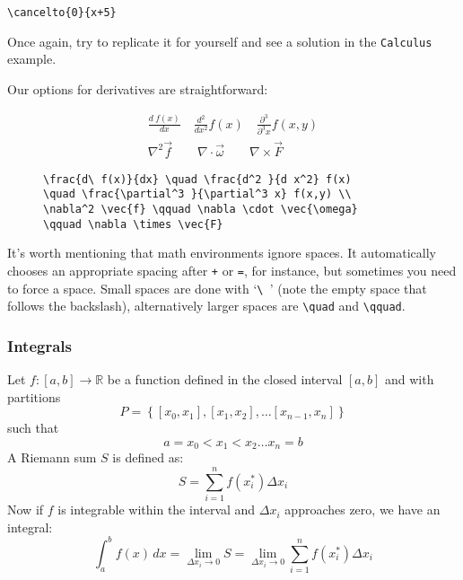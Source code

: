 \begin{lstlisting}
\cancelto{0}{x+5}
\end{lstlisting} 

Once again, try to replicate it for yourself and see a solution in the \texttt{Calculus} example.

Our options for derivatives are straightforward:
\begin{figure}[h]
    \begin{minipage}{0.40\textwidth}
        \begin{align*}
            \frac{d\ f(x)}{dx} \quad \frac{d^2 }{d x^2} f(x)
            \quad \frac{\partial^3 }{\partial^3 x} f(x,y) \\
            \nabla^2 \vec{f} \qquad \nabla \cdot \vec{\omega}
            \qquad \nabla \times \vec{F}  
        \end{align*}
    \end{minipage}
\hfill
\begin{minipage}{0.59\textwidth}
\begin{lstlisting}
\frac{d\ f(x)}{dx} \quad \frac{d^2 }{d x^2} f(x)
\quad \frac{\partial^3 }{\partial^3 x} f(x,y) \\
\nabla^2 \vec{f} \qquad \nabla \cdot \vec{\omega}
\qquad \nabla \times \vec{F}  
\end{lstlisting}
\end{minipage}
\centering
\end{figure}

It's worth mentioning that math environments ignore spaces.
It automatically chooses an appropriate spacing after \verb|+| or \verb|=|, for instance, but sometimes you need to force a space.
Small spaces are done with `\verb|\ |' (note the empty space that follows the backslash), alternatively larger spaces are \verb|\quad| and \verb|\qquad|.

\subsubsection{Integrals}
Let \( f: [a,b] \to \mathbb{R} \) be a function defined in the closed interval \( [a,b] \) and with partitions
\begin{equation*}
    P = \left \{ 
        [x_0,x_1], [x_1,x_2], \dots [x_{n-1},x_n]
     \right \}
\end{equation*}
such that
\begin{equation*}
    a = x_0 < x_1 < x_2 \dots x_n = b
\end{equation*}
A Riemann sum \( S \) is defined as:
\begin{equation}
    S = \sum_{i=1}^{n} f(x_i^*) \Delta x_i
\end{equation}
Now if \( f \) is integrable within the interval and \( \Delta x_i \) approaches zero, we have an integral:
\begin{equation}
    \int_a^b f(x) \,dx= \lim_{\Delta x_i \to 0}S = \lim_{\Delta x_i \to 0} \sum_{i=1}^{n} f(x_i^*) \Delta x_i 
\end{equation}

